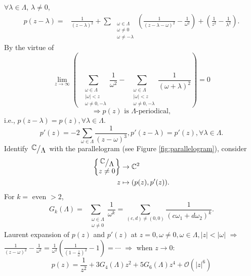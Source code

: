   $\forall \lambda \in \Lambda$, $\lambda\neq 0$, 
  \begin{align*}
    p(z-\lambda)= & \frac{1}{(z-\lambda)^2}+\sum_{\begin{smallmatrix} & \omega \in \Lambda\\ &\omega\neq 0\\&\omega\neq -\lambda  \end{smallmatrix} }\left( \frac{1}{(z-\lambda-\omega)^2}-\frac{1}{\omega^2} \right) +\left( \frac{1}{z^2}-\frac{1}{\lambda^2} \right)
  .\end{align*}
 By the virtue of 
 \[
   \lim_{z\to \infty}\left( \sum_{\begin{smallmatrix} &\omega \in \Lambda\\&|\omega|<z\\&\omega\neq 0,-\lambda  \end{smallmatrix} }\frac{1}{\omega^2}- \sum_{\begin{smallmatrix}&\omega \in \Lambda\\&|\omega|<z\\&\omega\neq 0,-\lambda  \end{smallmatrix} }\frac{1}{(\omega+\lambda)^2} \right) =0
 \] 
 \[
   \Rightarrow p(z) \text{ is } \Lambda\text{-periodical},
 \] 
 i.e., $p(z-\lambda)=p(z),\forall \lambda \in \Lambda$.
\[
  p'(z)=-2\sum_{\omega \in \Lambda}\frac{1}{(z-\omega)^3}, p'(z-\lambda)=p'(z),\forall \lambda \in \Lambda.
\] 
Identify $\sfrac{\C}{\Lambda}$ with the parallelogram (see Figure \ref{fig:parallelogram}), consider
\begin{align*}
  \left\{
    \begin{matrix} \sfrac{\C}{\Lambda}\\z\neq 0 \end{matrix} 
  \right\}&\to  \C^2\\
  z&\mapsto  (p(z),p'(z))
.\end{align*}
For $k=\text{ even }>2$,
\[
  G_k(\Lambda)= \sum_{\begin{smallmatrix}&\omega \in \Lambda\\&\omega\neq 0  \end{smallmatrix} }\frac{1}{\omega^{k}}=\sum_{(c,d)\neq(0,0)}\frac{1}{\left(c\omega_1+d\omega_2  \right) ^{k}}.
\]
Laurent expansion of $p(z)$ and $p'(z)$ at  $z=0,\omega\neq 0,\omega \in \Lambda,|z|<|\omega|$ $\Rightarrow$  $\frac{1}{(z-\omega)^2}-\frac{1}{\omega^2}=\frac{1}{\omega^2}\left( \frac{1}{\left( 1- \frac{z}{\omega} \right) ^2}-1 \right) =\cdots$ $\Rightarrow$ when $z\to 0$:
\begin{equation}\label{3-11}
   p(z)= \frac{1}{z^2}+3G_4(\Lambda)z^2+5G_6(\Lambda)z^{4}+\mathcal{O}(|z|^{6})
\end{equation}
